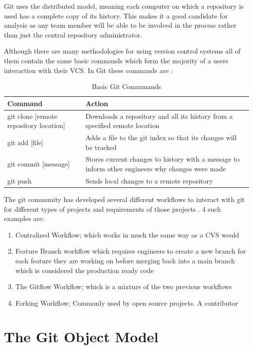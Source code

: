 \documentclass[11pt]{book}
\begin{document}
Git uses the distributed model, meaning each computer on which a repository is used has a complete copy of its history. This makes it a good candidate for analysis as any team member will be able to be involved in the process rather than just the central repository administrator.

Although there are many methodologies for using version control systems all of them contain the same basic commands which form the majority of a users interaction with their VCS. In Git these commands are \cite{gitrefbasic}: 

\begin{table}[h]
\centering
\label{basic-git-commands}
\begin{tabular}{| l | p{9cm} |}
\hline
\textbf{Command} & \textbf{Action} \\ \hline
git clone [remote repository location] & Downloads a repository and all its history from a specified remote location \\ \hline
git add [file] & Adds a file to the git index so that its changes will be tracked \\ \hline
git commit [message] & Stores current changes to history with a message to inform other engineers why changes were made \\ \hline
git push & Sends local changes to a remote repository \\ \hline
\end{tabular}
\caption{Basic Git Commmands}
\end{table}

The git community has developed several different workflows to interact with git for different types of projects and requirements of those projects \cite{gitcomparingworkflows}. 4 such examples are: 

\begin{enumerate}
	\item Centralized Workflow; which works in much the same way as a CVS would
	\item Feature Branch workflow which requires engineers to create a new branch for each feature they are working on before merging back into a main branch which is considered the production ready code
	\item The Gitflow Workflow; which is a mixture of the two previous workflows
	\item Forking Workflow; Commonly used by open source projects. A contributor 
\end{enumerate}


\section{The Git Object Model}
\end{document}

